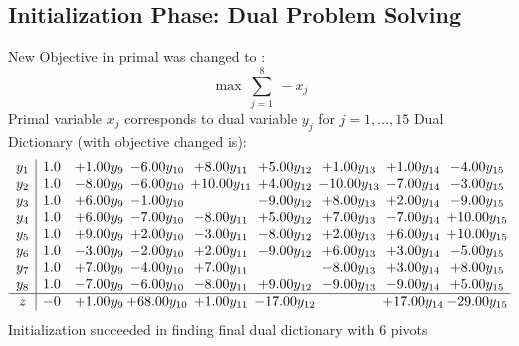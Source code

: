 \documentclass[9pt]{article}
\begin{document}
\subsection{Initialization Phase: Dual Problem Solving}
New Objective in primal was changed to : \[ \max\ \sum_{j=1}^{8}\ - x_j \] 
Primal variable $x_j$ corresponds to dual variable $y_j$ for $j = 1,\ldots,15$
Dual Dictionary (with objective changed is): 
\[\begin{array}{c| c c@{\hskip 2pt} c@{\hskip 2pt} c@{\hskip 2pt} c@{\hskip 2pt} c@{\hskip 2pt} c@{\hskip 2pt} c@{\hskip 2pt} }
 y_{1}   &  1.0 & +  1.00 y_{9} & -6.00 y_{10} & +  8.00 y_{11} & +  5.00 y_{12} & +  1.00 y_{13} & +  1.00 y_{14} & -4.00 y_{15}\\
 y_{2}   &  1.0 & -8.00 y_{9} & -6.00 y_{10} & + 10.00 y_{11} & +  4.00 y_{12} & -10.00 y_{13} & -7.00 y_{14} & -3.00 y_{15}\\
 y_{3}   &  1.0 & +  6.00 y_{9} & -1.00 y_{10} &   & -9.00 y_{12} & +  8.00 y_{13} & +  2.00 y_{14} & -9.00 y_{15}\\
 y_{4}   &  1.0 & +  6.00 y_{9} & -7.00 y_{10} & -8.00 y_{11} & +  5.00 y_{12} & +  7.00 y_{13} & -7.00 y_{14} & + 10.00 y_{15}\\
 y_{5}   &  1.0 & +  9.00 y_{9} & +  2.00 y_{10} & -3.00 y_{11} & -8.00 y_{12} & +  2.00 y_{13} & +  6.00 y_{14} & + 10.00 y_{15}\\
 y_{6}   &  1.0 & -3.00 y_{9} & -2.00 y_{10} & +  2.00 y_{11} & -9.00 y_{12} & +  6.00 y_{13} & +  3.00 y_{14} & -5.00 y_{15}\\
 y_{7}   &  1.0 & +  7.00 y_{9} & -4.00 y_{10} & +  7.00 y_{11} &   & -8.00 y_{13} & +  3.00 y_{14} & +  8.00 y_{15}\\
 y_{8}   &  1.0 & -7.00 y_{9} & -6.00 y_{10} & -8.00 y_{11} & +  9.00 y_{12} & -9.00 y_{13} & -9.00 y_{14} & +  5.00 y_{15}\\
\hline
z    &  -0 & +  1.00 y_{9} & + 68.00 y_{10} & +  1.00 y_{11} & -17.00 y_{12} &   & + 17.00 y_{14} & -29.00 y_{15}\\
\end{array}\]
Initialization succeeded in finding final dual dictionary with 6 pivots
\end{document}
